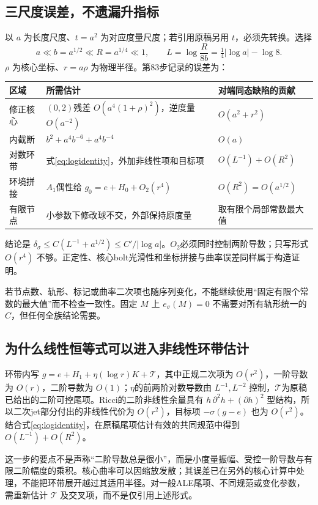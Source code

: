 \documentclass[UTF8,a4paper,11pt,fontset=fandol]{ctexart}
\numberwithin{equation}{section}
\theoremstyle{definition}
\begin{document}
\subsection{三尺度误差，不遗漏升指标}
以 $a$ 为长度尺度、$t=a^2$ 为对应度量尺度；若引用原稿另用 $t$，必须先转换。选择
\begin{equation}
a\ll b=a^{1/2}\ll R=a^{1/4}\ll1,\qquad
L=\log\frac{R}{8b}=\tfrac14|\log a|-\log8.
\end{equation}
$\rho$ 为核心坐标、$r=a\rho$ 为物理半径。第83步记录的误差为：
\begin{longtable}{L{.18\textwidth}L{.43\textwidth}L{.30\textwidth}}
\toprule 区域 & 所需估计 & 对端同态缺陷的贡献\\\midrule\endhead
修正核心 & $(0,2)$残差 $O(a^4(1+\rho)^2)$，逆度量 $O(a^{-2})$ & $O(a^2+r^2)$\\
内截断 & $b^2+a^4b^{-6}+a^4b^{-4}$ & $O(a)$\\
对数环带 & 式\eqref{eq:logidentity}，外加非线性项和目标项 & $O(L^{-1})+O(R^2)$\\
环境拼接 & $A_1$偶性给 $g_0=e+H_0+O_2(r^4)$ & $O(R^2)=O(a^{1/2})$\\
有限节点 & 小参数下修改球不交，外部保持原度量 & 取有限个局部常数最大值\\\bottomrule
\end{longtable}
结论是 $\delta_\sigma\le C(L^{-1}+a^{1/2})\le C'/|\log a|$。$O_2$必须同时控制两阶导数；只写形式 $O(r^4)$ 不够。正定性、核心bolt光滑性和坐标拼接与曲率误差同样属于构造证明。

若节点数、轨形、标记或曲率二次项也随序列变化，不能继续使用“固定有限个常数的最大值”而不检查一致性。固定 $M$ 上 $e_\sigma(M)=0$ 不需要对所有轨形统一的 $C$，但任何全族结论需要。


\subsection{为什么线性恒等式可以进入非线性环带估计}
环带内写 $g=e+H_1+\eta(\log r)K+\mathcal T$，其中正规二次项为 $O(r^2)$，一阶导数为 $O(r)$，二阶导数为 $O(1)$；$\eta$的前两阶对数导数由 $L^{-1},L^{-2}$ 控制，$\mathcal T$为原稿已给出的二阶可控尾项。Ricci的二阶非线性余量具有 $h\,\partial^2h+(\partial h)^2$ 型结构，所以二次jet部分付出的非线性代价为 $O(r^2)$，目标项 $-\sigma(g-e)$ 也为 $O(r^2)$。结合式\eqref{eq:logidentity}，在原稿尾项估计有效的共同规范中得到 $O(L^{-1})+O(R^2)$。

这一步的要点不是声称“二阶导数总是很小”，而是小度量振幅、受控一阶导数与有限二阶幅度的乘积。核心曲率可以因缩放发散；其误差已在另外的核心计算中处理，不能把环带展开越过其适用半径。对一般ALE尾项、不同规范或变化参数，需重新估计 $\mathcal T$ 及交叉项，而不是仅引用上述形式。
\end{document}
